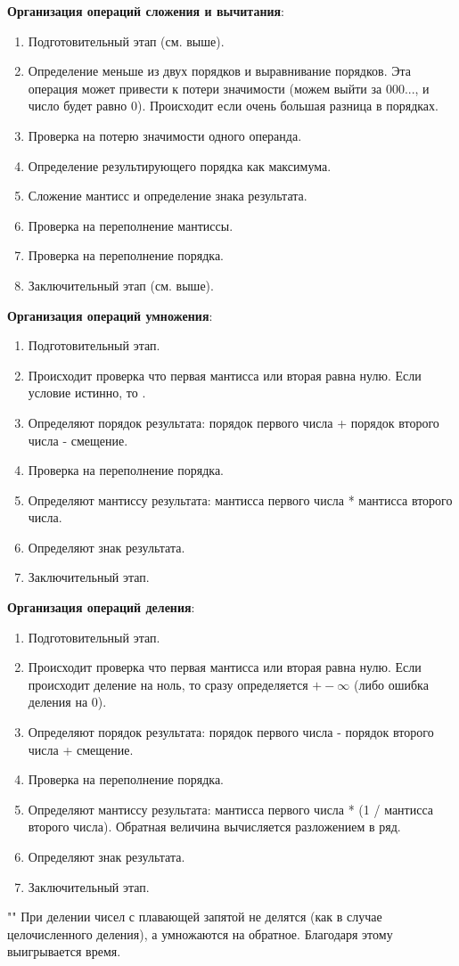 \documentclass[a4paper,12pt]{article}
\begin{document}
	\textbf{Организация операций \textbf{сложения и вычитания}}:
	
	\begin{enumerate}
		\item Подготовительный этап (см. выше).
		\item Определение меньше из двух порядков и выравнивание порядков. Эта операция может привести к потери значимости (можем выйти за 000..., и число будет равно 0). Происходит если очень большая разница в порядках.
		\item Проверка на потерю значимости одного операнда.
		\item Определение результирующего порядка как максимума.
		\item Сложение мантисс и определение знака результата.
		\item Проверка на переполнение мантиссы.
		\item Проверка на переполнение порядка.
		\item Заключительный этап (см. выше).
	\end{enumerate}
	
	\textbf{Организация операций \textbf{умножения}}:

	\begin{enumerate}
		\item Подготовительный этап.
		\item Происходит проверка что первая мантисса или вторая равна нулю. Если условие истинно, то .
		\item Определяют порядок результата: порядок первого числа + порядок второго числа - смещение.
		\item Проверка на переполнение порядка.
		\item Определяют мантиссу результата: мантисса первого числа * мантисса второго числа.
		\item Определяют знак результата.
		\item Заключительный этап.
	\end{enumerate}

	\textbf{Организация операций \textbf{деления}}:

	\begin{enumerate}
		\item Подготовительный этап.
		\item Происходит проверка что первая мантисса или вторая равна нулю. Если происходит деление на ноль, то сразу определяется $+-\infty$ (либо ошибка деления на 0).
		\item Определяют порядок результата: порядок первого числа - порядок второго числа + смещение.
		\item Проверка на переполнение порядка.
		\item Определяют мантиссу результата: мантисса первого числа * (1 / мантисса второго числа). Обратная величина вычисляется разложением в ряд.
		\item Определяют знак результата.
		\item Заключительный этап.
	\end{enumerate}
	
		""\newline
	При делении чисел с  плавающей запятой не делятся (как в случае целочисленного деления), а умножаются на обратное. Благодаря этому выигрывается время. 
\end{document}

